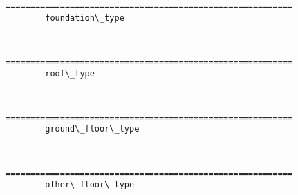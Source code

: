 \documentclass[11pt]{article}
\begin{document}
    \begin{Verbatim}[commandchars=\\\{\}]
==========================================================
	 	foundation\_type

    \end{Verbatim}

    \begin{center}
    \end{center}
    { \hspace*{\fill} \\}
    
    \begin{Verbatim}[commandchars=\\\{\}]
==========================================================
	 	roof\_type

    \end{Verbatim}

    \begin{center}
    \end{center}
    { \hspace*{\fill} \\}
    
    \begin{Verbatim}[commandchars=\\\{\}]
==========================================================
	 	ground\_floor\_type

    \end{Verbatim}

    \begin{center}
    \end{center}
    { \hspace*{\fill} \\}
    
    \begin{Verbatim}[commandchars=\\\{\}]
==========================================================
	 	other\_floor\_type

    \end{Verbatim}

    \begin{center}
    \end{center}
    { \hspace*{\fill} \\}
    
\end{document}
